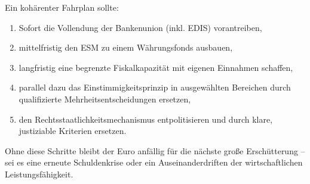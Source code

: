\documentclass[12pt,a4paper]{article}
\begin{document}
	Ein kohärenter Fahrplan sollte:
	\begin{enumerate}
		\item Sofort die Vollendung der Bankenunion (inkl. EDIS) vorantreiben,
		\item mittelfristig den ESM zu einem Währungsfonds ausbauen,
		\item langfristig eine begrenzte Fiskalkapazität mit eigenen Einnahmen schaffen,
		\item parallel dazu das Einstimmigkeitsprinzip in ausgewählten Bereichen durch qualifizierte Mehrheitsentscheidungen ersetzen,
		\item den Rechtsstaatlichkeitsmechanismus entpolitisieren und durch klare, justiziable Kriterien ersetzen.
	\end{enumerate}
	Ohne diese Schritte bleibt der Euro anfällig für die nächste große Erschütterung – sei es eine erneute Schuldenkrise oder ein Auseinanderdriften der wirtschaftlichen Leistungsfähigkeit.
	
\end{document}
